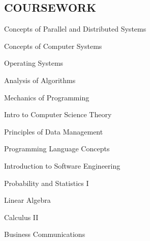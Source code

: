 \documentclass[line, margin]{res}
\begin{document}
\begin{resume}
\section{COURSEWORK}
      \begin{enumerate*}[series=MyList, before=\hspace{-0.6ex}, label=\textbullet]
        \item Concepts of Parallel and Distributed Systems
        \item Concepts of Computer Systems
        \item Operating Systems
        \item Analysis of Algorithms
        \item Mechanics of Programming
        \item Intro to Computer Science Theory
        \item Principles of Data Management
        \item Programming Language Concepts
        \item Introduction to Software Engineering
        \item Probability and Statistics I
        \item Linear Algebra
        \item Calculus II
        \item Business Communications
      \end{enumerate*}

 
\end{resume}
\end{document}
